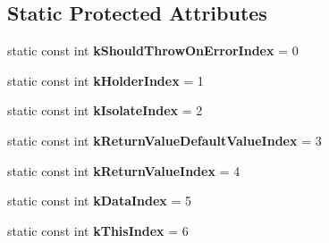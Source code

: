 \subsection*{Static Protected Attributes}
\begin{DoxyCompactItemize}
\item 
static const int {\bfseries k\+Should\+Throw\+On\+Error\+Index} = 0\hypertarget{classv8_1_1PropertyCallbackInfo_aab5f05fed930b0cad97ed7f96520f60e}{}\label{classv8_1_1PropertyCallbackInfo_aab5f05fed930b0cad97ed7f96520f60e}

\item 
static const int {\bfseries k\+Holder\+Index} = 1\hypertarget{classv8_1_1PropertyCallbackInfo_a8598985473483dfadba4e4c67251675b}{}\label{classv8_1_1PropertyCallbackInfo_a8598985473483dfadba4e4c67251675b}

\item 
static const int {\bfseries k\+Isolate\+Index} = 2\hypertarget{classv8_1_1PropertyCallbackInfo_a59ba899cb580bc5e8adca6f799db3e2a}{}\label{classv8_1_1PropertyCallbackInfo_a59ba899cb580bc5e8adca6f799db3e2a}

\item 
static const int {\bfseries k\+Return\+Value\+Default\+Value\+Index} = 3\hypertarget{classv8_1_1PropertyCallbackInfo_a00849f770023891d1466176f5e0c8539}{}\label{classv8_1_1PropertyCallbackInfo_a00849f770023891d1466176f5e0c8539}

\item 
static const int {\bfseries k\+Return\+Value\+Index} = 4\hypertarget{classv8_1_1PropertyCallbackInfo_ae16cdf2c6ce787b21d94953cd514ed0e}{}\label{classv8_1_1PropertyCallbackInfo_ae16cdf2c6ce787b21d94953cd514ed0e}

\item 
static const int {\bfseries k\+Data\+Index} = 5\hypertarget{classv8_1_1PropertyCallbackInfo_a39fc5d6aaccb2916af503c7120ab99c5}{}\label{classv8_1_1PropertyCallbackInfo_a39fc5d6aaccb2916af503c7120ab99c5}

\item 
static const int {\bfseries k\+This\+Index} = 6\hypertarget{classv8_1_1PropertyCallbackInfo_a715d28b9c57a581de1698673c9b9eb8a}{}\label{classv8_1_1PropertyCallbackInfo_a715d28b9c57a581de1698673c9b9eb8a}

\end{DoxyCompactItemize}
